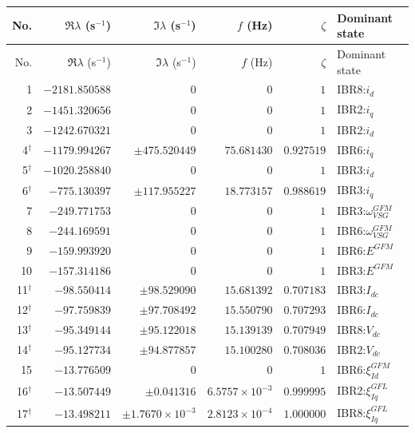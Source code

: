 \begingroup\footnotesize\setlength{\tabcolsep}{3pt}
\begin{longtable}{@{}r r r r r l@{}}
\toprule
No. & $\Re\lambda$ (s$^{-1}$) & $\Im\lambda$ (s$^{-1}$) & $f$ (Hz) & $\zeta$ & Dominant state \\ \midrule
\endfirsthead
\toprule
No. & $\Re\lambda$ (s$^{-1}$) & $\Im\lambda$ (s$^{-1}$) & $f$ (Hz) & $\zeta$ & Dominant state \\ \midrule
\endhead
1 & $-2181.850588$ & $0$ & $0$ & $1$ & IBR8:$i_d$ \\ 
2 & $-1451.320656$ & $0$ & $0$ & $1$ & IBR2:$i_q$ \\ 
3 & $-1242.670321$ & $0$ & $0$ & $1$ & IBR2:$i_d$ \\ 
4$^{\dagger}$ & $-1179.994267$ & $\pm475.520449$ & $75.681430$ & $0.927519$ & IBR6:$i_q$ \\ 
5$^{\dagger}$ & $-1020.258840$ & $0$ & $0$ & $1$ & IBR3:$i_d$ \\ 
6$^{\dagger}$ & $-775.130397$ & $\pm117.955227$ & $18.773157$ & $0.988619$ & IBR3:$i_q$ \\ 
7 & $-249.771753$ & $0$ & $0$ & $1$ & IBR3:$\omega_{VSG}^{GFM}$ \\ 
8 & $-244.169591$ & $0$ & $0$ & $1$ & IBR6:$\omega_{VSG}^{GFM}$ \\ 
9 & $-159.993920$ & $0$ & $0$ & $1$ & IBR6:$E^{GFM}$ \\ 
10 & $-157.314186$ & $0$ & $0$ & $1$ & IBR3:$E^{GFM}$ \\ 
11$^{\dagger}$ & $-98.550414$ & $\pm98.529090$ & $15.681392$ & $0.707183$ & IBR3:$I_{dc}$ \\ 
12$^{\dagger}$ & $-97.759839$ & $\pm97.708492$ & $15.550790$ & $0.707293$ & IBR6:$I_{dc}$ \\ 
13$^{\dagger}$ & $-95.349144$ & $\pm95.122018$ & $15.139139$ & $0.707949$ & IBR8:$V_{dc}$ \\ 
14$^{\dagger}$ & $-95.127734$ & $\pm94.877857$ & $15.100280$ & $0.708036$ & IBR2:$V_{dc}$ \\ 
15 & $-13.776509$ & $0$ & $0$ & $1$ & IBR6:$\xi_{Id}^{GFM}$ \\ 
16$^{\dagger}$ & $-13.507449$ & $\pm0.041316$ & $6.5757\times10^{-3}$ & $0.999995$ & IBR2:$\xi_{Iq}^{GFL}$ \\ 
17$^{\dagger}$ & $-13.498211$ & $\pm1.7670\times10^{-3}$ & $2.8123\times10^{-4}$ & $1.000000$ & IBR8:$\xi_{Iq}^{GFL}$ \\ 

\end{longtable}
